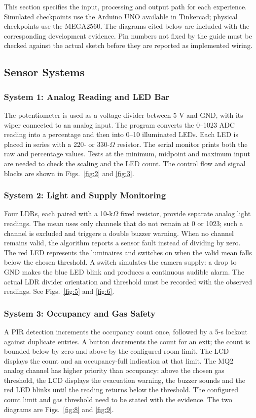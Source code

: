 This section specifies the input, processing and output path for each
experience. Simulated checkpoints use the Arduino UNO available in Tinkercad;
physical checkpoints use the MEGA2560. The diagrams cited below are included
with the corresponding development evidence. Pin numbers not fixed by the
guide must be checked against the actual sketch before they are reported as
implemented wiring.

\subsection{Sensor Systems}

\subsubsection{System 1: Analog Reading and LED Bar}
The potentiometer is used as a voltage divider between 5 V and GND, with its
wiper connected to an analog input. The program converts the 0--1023 ADC
reading into a percentage and then into 0--10 illuminated LEDs. Each LED is
placed in series with a 220- or 330-$\Omega$ resistor. The serial monitor
prints both the raw and percentage values. Tests at the minimum, midpoint
and maximum input are needed to check the scaling and the LED count. The
control flow and signal blocks are shown in Figs.~\ref{fig:2} and
\ref{fig:3}.

\subsubsection{System 2: Light and Supply Monitoring}
Four LDRs, each paired with a 10-k$\Omega$ fixed resistor, provide separate
analog light readings. The mean uses only channels that do not remain at 0
or 1023; such a channel is excluded and triggers a double buzzer warning.
When no channel remains valid, the algorithm reports a sensor fault instead
of dividing by zero. The red LED represents the luminaires and switches on
when the valid mean falls below the chosen threshold. A switch simulates the
camera supply: a drop to GND makes the blue LED blink and produces a
continuous audible alarm. The actual LDR divider orientation and threshold
must be recorded with the observed readings. See Figs.~\ref{fig:5} and
\ref{fig:6}.

\subsubsection{System 3: Occupancy and Gas Safety}
A PIR detection increments the occupancy count once, followed by a 5-s
lockout against duplicate entries. A button decrements the count for an exit;
the count is bounded below by zero and above by the configured room limit.
The LCD displays the count and an occupancy-full indication at that limit.
The MQ2 analog channel has higher priority than occupancy: above the chosen
gas threshold, the LCD displays the evacuation warning, the buzzer sounds
and the red LED blinks until the reading returns below the threshold. The
configured count limit and gas threshold need to be stated with the evidence.
The two diagrams are Figs.~\ref{fig:8} and \ref{fig:9}.

